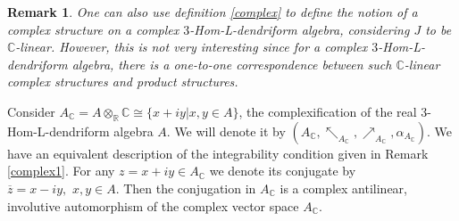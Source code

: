 \documentclass[a4paper,11pt]{article}
\def\a{\alpha}
\def\nw{\nwarrow}
\def\ne{\nearrow}
\newtheorem{rem}[thm]{Remark}
\theoremstyle{definition}
\begin{document}
\begin{rem}
One can also use definition \ref{complex} to define the notion of a complex structure on a
complex $3$-Hom-L-dendriform algebra, considering $J$ to be $\mathbb C$-linear. However, this is not very interesting since
for a complex $3$-Hom-L-dendriform algebra, there is a one-to-one correspondence between such $\mathbb C$-linear complex
structures and product structures.
\end{rem}



Consider  $A_{\mathbb C}=A\otimes_{\mathbb R} \mathbb C\cong\{x+iy|x,y\in A\}$, the complexification of the
real $3$-Hom-L-dendriform algebra $A$. We will denote it by $(A_{\mathbb C},\nw_{A_{\mathbb C}},\ne_{A_{\mathbb C}},\a_{A_{\mathbb C}})$. We have an equivalent description of the integrability condition given in
Remark \ref{complex1}. For any $z=x+iy\in A_{\mathbb C}$ we denote its conjugate by $\overline{z}=x-iy,\,\,x,y\in A$. Then the conjugation in $ A_{\mathbb C}$ is a complex antilinear, involutive automorphism of the complex vector space $A_{\mathbb C}$.
\end{document}
